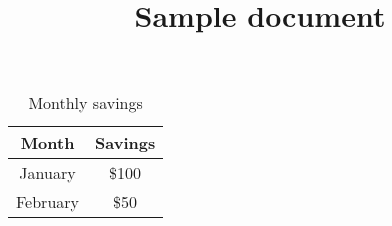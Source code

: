 \documentclass{report}
\title{Sample document}
\begin{document}
\maketitle
\begin{table}[!ht]
\caption{
Monthly savings}
\centering
\begin{tabular}
{ |c|c| }
\hline   \textbf{ Month}
 & \textbf{ Savings}
\\ 
\hline January &  \$100\\ 
\hline February &  \$50\\ 
\hline 
 \end{tabular}
\end{table}
\end{document}
